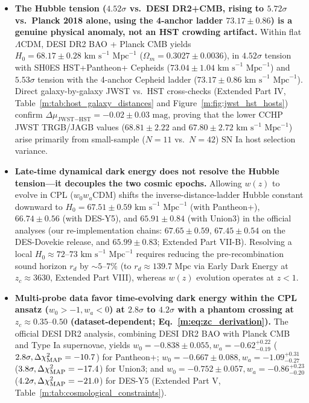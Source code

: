 \documentclass[aps,prd,preprint,superscriptaddress,nofootinbib]{revtex4-2}
\begin{document}
\begin{itemize}
    \setlength{\itemsep}{6pt}
    \item[\textcolor{tealaccent}{\textbullet}] \textbf{The Hubble tension ($4.52\sigma$ vs.\ DESI DR2+CMB, rising to $5.72\sigma$ vs.\ Planck 2018 alone, using the 4-anchor ladder $73.17 \pm 0.86$) is a genuine physical anomaly, not an HST crowding artifact.} Within flat $\Lambda$CDM, DESI DR2 BAO + Planck CMB yields $H_0 = 68.17 \pm 0.28\text{ km s}^{-1}\text{ Mpc}^{-1}$ ($\Omega_m = 0.3027 \pm 0.0036$), in $4.52\sigma$ tension with SH0ES HST+Pantheon+ Cepheids ($73.04 \pm 1.04\text{ km s}^{-1}\text{ Mpc}^{-1}$) and $5.53\sigma$ tension with the 4-anchor Cepheid ladder ($73.17 \pm 0.86\text{ km s}^{-1}\text{ Mpc}^{-1}$). Direct galaxy-by-galaxy JWST vs.\ HST cross-checks (Extended Part IV, Table~\ref{m:tab:host_galaxy_distances} and Figure~\ref{m:fig:jwst_hst_hosts}) confirm $\Delta\mu_{\text{JWST}-\text{HST}} = -0.02 \pm 0.03\text{ mag}$, proving that the lower CCHP JWST TRGB/JAGB values ($68.81 \pm 2.22$ and $67.80 \pm 2.72\text{ km s}^{-1}\text{ Mpc}^{-1}$) arise primarily from small-sample ($N=11$ vs.\ $N=42$) SN Ia host selection variance.
    \item[\textcolor{tealaccent}{\textbullet}] \textbf{Late-time dynamical dark energy does not resolve the Hubble tension---it decouples the two cosmic epochs.} Allowing $w(z)$ to evolve in CPL ($w_0 w_a$CDM) shifts the inverse-distance-ladder Hubble constant downward to $H_0 = 67.51 \pm 0.59\text{ km s}^{-1}\text{ Mpc}^{-1}$ (with Pantheon+), $66.74 \pm 0.56$ (with DES-Y5), and $65.91 \pm 0.84$ (with Union3) in the official analyses (our re-implementation chains: $67.65 \pm 0.59$, $67.45 \pm 0.54$ on the DES-Dovekie release, and $65.99 \pm 0.83$; Extended Part VII-B). Resolving a local $H_0 \approx 72\text{--}73\text{ km s}^{-1}\text{ Mpc}^{-1}$ requires reducing the pre-recombination sound horizon $r_d$ by $\sim 5\text{--}7\%$ (to $r_d \approx 139.7\text{ Mpc}$ via Early Dark Energy at $z_c \approx 3630$, Extended Part VIII), whereas $w(z)$ evolution operates at $z < 1$.
    \item[\textcolor{tealaccent}{\textbullet}] \textbf{Multi-probe data favor time-evolving dark energy within the CPL ansatz ($w_0 > -1, w_a < 0$) at $2.8\sigma$ to $4.2\sigma$ with a phantom crossing at $z_c \approx 0.35\text{--}0.50$ (dataset-dependent; Eq.~\ref{m:eq:zc_derivation}).} The official DESI DR2 analysis, combining DESI DR2 BAO with Planck CMB and Type Ia supernovae, yields $w_0 = -0.838 \pm 0.055, w_a = -0.62^{+0.22}_{-0.19}$ ($2.8\sigma, \Delta\chi^2_{\rm MAP} = -10.7$) for Pantheon+; $w_0 = -0.667 \pm 0.088, w_a = -1.09^{+0.31}_{-0.27}$ ($3.8\sigma, \Delta\chi^2_{\rm MAP} = -17.4$) for Union3; and $w_0 = -0.752 \pm 0.057, w_a = -0.86^{+0.23}_{-0.20}$ ($4.2\sigma, \Delta\chi^2_{\rm MAP} = -21.0$) for DES-Y5 (Extended Part V, Table~\ref{m:tab:cosmological_constraints}).

\end{itemize}
\end{document}
